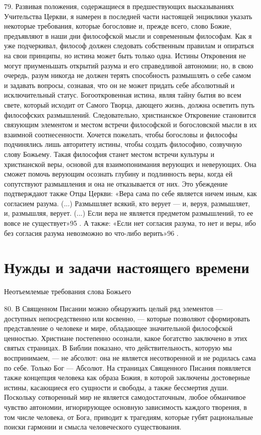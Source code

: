 \documentclass[a5paper,10pt]{article}
\begin{document}
79. Развивая положения, содержащиеся в предшествующих высказываниях Учительства
Церкви, я намерен в последней части настоящей энциклики указать некоторые
требования, которые богословие и, прежде всего, слово Божие, предъявляют в наши
дни философской мысли и современным философам. Как я уже подчеркивал, философ
должен следовать собственным правилам и опираться на свои принципы, но истина
может быть только одна. Истины Откровения не могут приуменьшать открытий разума
и его справедливой автономии; но, в свою очередь, разум никогда не должен
терять способность размышлять о себе самом и задавать вопросы, сознавая, что он
не может придать себе абсолютный и исключительный статус. Богооткровенная
истина, являя тайну бытия во всем свете, который исходит от Самого Творца,
дающего жизнь, должна осветить путь философских размышлений. Следовательно,
христианское Откровение становится связующим элементом и местом встречи
философской и богословской мысли в их взаимной соотнесенности. Хочется
пожелать, чтобы богословы и философы подчинялись лишь авторитету истины, чтобы
создать философию, созвучную слову Божьему. Такая философия станет местом
встречи культуры и христианской веры, основой для взаимопонимания верующих и
неверующих. Она сможет помочь верующим осознать глубину и подлинность веры,
когда ей сопутствуют размышления и она не отказывается от них. Это убеждение
подтверждают также Отцы Церкви: «Вера сама по себе является ничем иным, как
согласием разума. (...) Размышляет всякий, кто верует — и, веруя, размышляет,
и, размышляя, верует. (...) Если вера не является предметом размышлений, то ее
вовсе не существует»95 . А также: «Если нет согласия разума, то нет и веры, ибо
без согласия разума невозможно во что-либо верить»96 .

\section{Нужды и задачи настоящего времени}

Неотъемлемые требования слова Божьего

80. В Священном Писании можно обнаружить целый ряд элементов — доступных
непосредственно или косвенно, — которые позволяют сформировать представление о
человеке и мире, обладающее значительной философской ценностью. Христиане
постепенно осознали, какое богатство заключено в этих святых страницах. В
Библии показано, что действительность, которую мы воспринимаем, — не абсолют:
она не является несотворенной и не родилась сама по себе. Только Бог — Абсолют.
На страницах Священного Писания появляется также концепция человека как образа
Божия, в которой заключены достоверные истины, касающиеся его сущности и
свободы, а также бессмертия души. Поскольку сотворенный мир не является
самодостаточным, любое обманчивое чувство автономии, игнорирующее основную
зависимость каждого творения, в том числе человека, от Бога, приводит к
трагедиям, которые губят рациональные поиски гармонии и смысла человеческого
существования.
\end{document}
